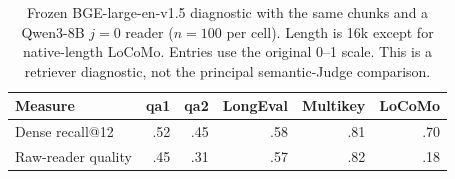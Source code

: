 \begin{table}[htbp]
\centering
\small
\setlength{\tabcolsep}{4pt}
\begin{tabular}{@{}lrrrrr@{}}
\toprule
Measure & qa1 & qa2 & LongEval & Multikey & LoCoMo \\
\midrule
Dense recall@12 & .52 & .45 & .58 & .81 & .70 \\
Raw-reader quality & .45 & .31 & .57 & .82 & .18 \\
\bottomrule
\end{tabular}
\caption{Frozen BGE-large-en-v1.5 diagnostic with the same chunks and a Qwen3-8B $j=0$ reader ($n=100$ per cell). Length is 16k except for native-length LoCoMo. Entries use the original 0--1 scale. This is a retriever diagnostic, not the principal semantic-Judge comparison.}
\label{tab:dense-retrieval}
\end{table}
